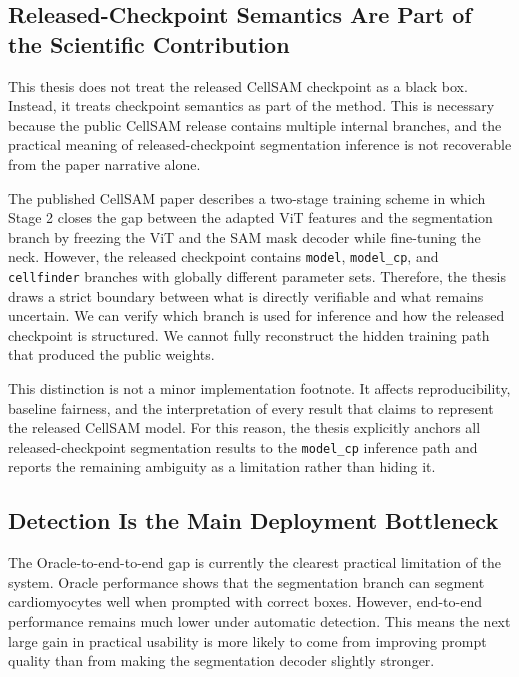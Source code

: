 \subsection{Released-Checkpoint Semantics Are Part of the Scientific Contribution}\label{released-checkpoint-semantics-are-part-of-the-scientific-contribution}

This thesis does not treat the released CellSAM checkpoint as a black box. Instead, it treats checkpoint semantics as part of the method. This is necessary because the public CellSAM release contains multiple internal branches, and the practical meaning of released-checkpoint segmentation inference is not recoverable from the paper narrative alone.

The published CellSAM paper describes a two-stage training scheme in which Stage 2 closes the gap between the adapted ViT features and the segmentation branch by freezing the ViT and the SAM mask decoder while fine-tuning the neck. However, the released checkpoint contains \texttt{model}, \texttt{model\_cp}, and \texttt{cellfinder} branches with globally different parameter sets. Therefore, the thesis draws a strict boundary between what is directly verifiable and what remains uncertain. We can verify which branch is used for inference and how the released checkpoint is structured. We cannot fully reconstruct the hidden training path that produced the public weights.

This distinction is not a minor implementation footnote. It affects reproducibility, baseline fairness, and the interpretation of every result that claims to represent the released CellSAM model. For this reason, the thesis explicitly anchors all released-checkpoint segmentation results to the \texttt{model\_cp} inference path and reports the remaining ambiguity as a limitation rather than hiding it.

\subsection{Detection Is the Main Deployment Bottleneck}\label{detection-is-the-main-deployment-bottleneck}

The Oracle-to-end-to-end gap is currently the clearest practical limitation of the system. Oracle performance shows that the segmentation branch can segment cardiomyocytes well when prompted with correct boxes. However, end-to-end performance remains much lower under automatic detection. This means the next large gain in practical usability is more likely to come from improving prompt quality than from making the segmentation decoder slightly stronger.

